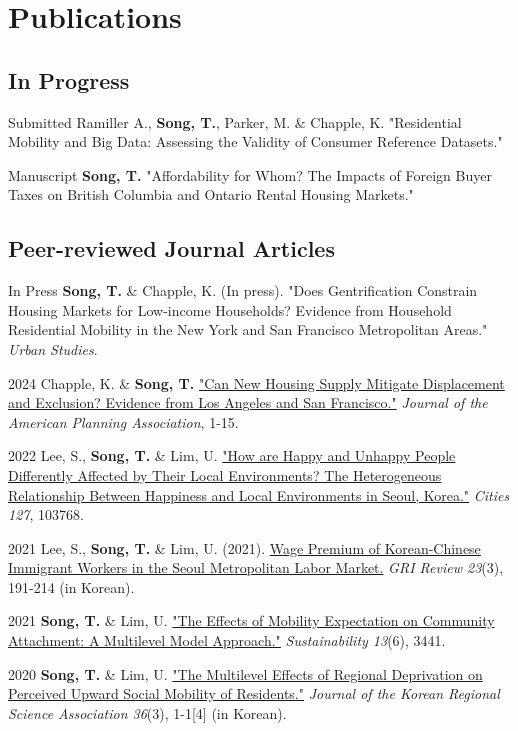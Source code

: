 \documentclass[12pt,letterpaper]{report}
\begin{document}
    \section*{Publications}
    \subsection*{In Progress}
    \begin{tablist}
        \item[Submitted] \tab{}Ramiller A., \textbf{Song, T.}, Parker, M. \& Chapple, K. "Residential Mobility and Big Data: Assessing the Validity of Consumer Reference Datasets."
        \item[Manuscript] \tab{}\textbf{Song, T.} "Affordability for Whom? The Impacts of Foreign Buyer Taxes on British Columbia and Ontario Rental Housing Markets."
        \end{tablist}
    \subsection*{Peer-reviewed Journal Articles}
    \begin{tablist}
        \item[In Press] \tab{}\textbf{Song, T.} \& Chapple, K. (In press). "Does Gentrification Constrain Housing Markets for Low-income Households? Evidence from Household Residential Mobility in the New York and San Francisco Metropolitan Areas." \emph{Urban Studies}.
        \item[2024] \tab{}Chapple, K. \& \textbf{Song, T.} \href{https://doi.org/10.1080/01944363.2024.2319293}{"Can New Housing Supply Mitigate Displacement and Exclusion? Evidence from Los Angeles and San Francisco."} \emph{Journal of the American Planning Association}, 1-15.
        \item[2022] \tab{}Lee, S., \textbf{Song, T.} \& Lim, U. \href{https://doi.org/10.1016/j.cities.2022.103768}{"How are Happy and Unhappy People Differently Affected by Their Local Environments? The Heterogeneous Relationship Between Happiness and Local Environments in Seoul, Korea."} \emph{Cities 127}, 103768.
        \item[2021] \tab{}Lee, S., \textbf{Song, T.} \& Lim, U. (2021). \href{https://www.dbpia.co.kr/Journal/articleDetail?nodeId=NODE11025769}{Wage Premium of Korean-Chinese Immigrant Workers in the Seoul Metropolitan Labor Market.} \emph{GRI Review 23}(3), 191-214 (in Korean).
        \item[2021] \tab{}\textbf{Song, T.} \& Lim, U. \href{https://www.mdpi.com/2071-1050/13/6/3441}{"The Effects of Mobility Expectation on Community Attachment: A Multilevel Model Approach."} \emph{Sustainability 13}(6), 3441.
        \item[2020] \tab{}\textbf{Song, T.} \& Lim, U. \href{"https://www.koreascience.or.kr/article/JAKO202030161655441.page}{"The Multilevel Effects of Regional Deprivation on Perceived Upward Social Mobility of Residents."} \emph{Journal of the Korean Regional Science Association 36}(3), 1-1[4] (in Korean).
    \end{tablist}
\end{document}
